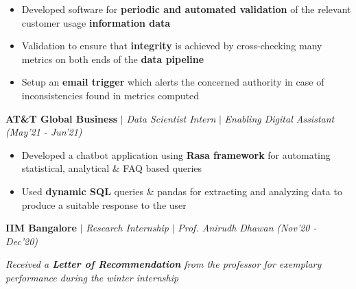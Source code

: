 \documentclass[10pt]{article}
\begin{document}
    \begin{itemize}[label={\textbullet},itemsep = -1 mm, leftmargin=*]
    \item Developed software for \textbf{periodic and automated validation} of the relevant customer usage \textbf{information data}
    \item Validation to ensure that \textbf{integrity} is achieved by cross-checking many metrics on both ends of the \textbf{data pipeline}
    \item Setup an \textbf{email trigger} which alerts the concerned authority in case of inconsistencies found in metrics computed
    
    \end{itemize}
\vspace{-6pt}
\textbf{AT\&T Global Business} \textbf{$|$} {\textit{Data Scientist Intern} \textbf{$|$} \textit{Enabling Digital Assistant}} \hfill{\sl \small (May'21 - Jun'21)}  	\\
    \vspace{-0.3cm}
    \hline
    \vspace{-2pt}

    \begin{itemize}[label={\textbullet},itemsep = -1 mm, leftmargin=*]
        \item Developed a chatbot application using \textbf{Rasa framework} for automating statistical, analytical \& FAQ based queries
        \item Used \textbf{dynamic SQL} queries \& pandas for extracting and analyzing data to produce a suitable response to the user


    
    \end{itemize}
\vspace{-6pt}
\textbf{IIM Bangalore} $|$ \textit{Research Internship} $|$ \textit{Prof. Anirudh Dhawan} \hfill{\sl \small (Nov'20 - Dec’20)}  \\
  \vspace{-0.3cm}
 \hline 
 \vspace{-2pt}
 \begin{flushleft}
\textit{Received a \textbf{Letter of Recommendation} from the professor for exemplary performance during the winter internship}
 \end{flushleft}
\end{document}
